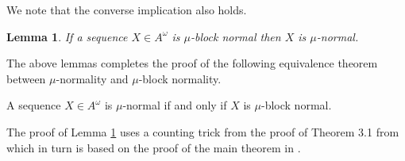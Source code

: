 \documentclass[11pt]{article}
\newtheorem{lemma}{Lemma}
\begin{document}
We note that the converse implication  also holds.

\begin{lemma}
\label{lem:blocknormalimpliesnormal}
	If a sequence $X \in A^\omega$ is $\mu$-block normal then $X$ is $\mu$-normal.
\end{lemma}

 The above lemmas completes the proof of the following equivalence theorem between $\mu$-normality and $\mu$-block normality.

\begin{theorem}
	A sequence $X \in A^\omega$ is $\mu$-normal if and only if $X$ is $\mu$-block normal.
\end{theorem}


The proof of Lemma \ref{lem:blocknormalimpliesnormal} uses a counting trick from the proof of Theorem 3.1 from \cite{NandakumarPVV2021} which in turn is based on the proof of the main theorem in \cite{Maxfield1952}.
\end{document}
